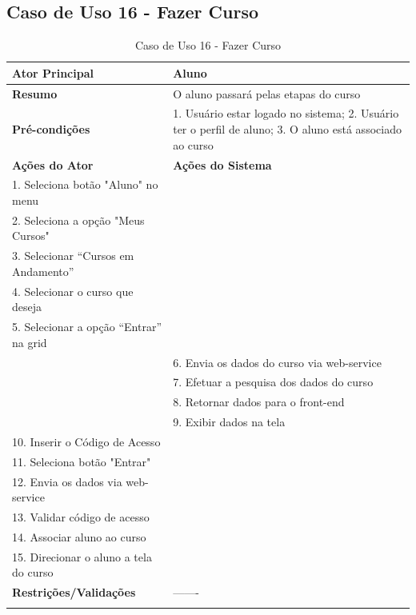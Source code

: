 \subsection{Caso de Uso 16 - Fazer Curso}
\label{sc:case16}
\begin{center}
\begin{longtable}{p{8cm}|p{8cm}}
    \hline
    \textbf{Ator Principal} & Aluno \\
    \hline
    \textbf{Resumo} & O aluno passará pelas etapas do curso \\
    \hline
    \textbf{Pr\'{e}-condi\c{c}\~{o}es} & 1. Usuário estar logado no sistema; 2. Usuário ter o perfil de aluno; 3. O aluno está associado ao curso \\
    \hline
    \textbf{A\c{c}\~{o}es do Ator} & \textbf{A\c{c}\~{o}es do Sistema} \\
    \hline
    1. Seleciona botão "Aluno" no menu \\
    \hline
    2. Seleciona a opção "Meus Cursos" \\
	\hline
    3. Selecionar “Cursos em Andamento” \\
	\hline
    4. Selecionar o curso que deseja  \\
	\hline
    5. Selecionar a opção “Entrar” na grid \\
    \hline
    & 6. Envia os dados do curso via web-service \\
	\hline
    & 7. Efetuar a pesquisa dos dados do curso \\
	\hline
    & 8. Retornar dados para o front-end \\
	\hline
    & 9. Exibir dados na tela \\
	\hline
    10. Inserir o Código de Acesso \\
	\hline
    11. Seleciona botão "Entrar" \\
	\hline
    12. Envia os dados via web-service \\
    \hline
    13. Validar código de acesso \\
	\hline
    14. Associar aluno ao curso \\
	\hline
    15. Direcionar o aluno a tela do curso \\
    \hline
    \hline
    \textbf{Restri\c{c}\~{o}es/Valida\c{c}\~{o}es} & -------\\
\hline
\caption{Caso de Uso 16 - Fazer Curso}
\end{longtable}
\end{center}

